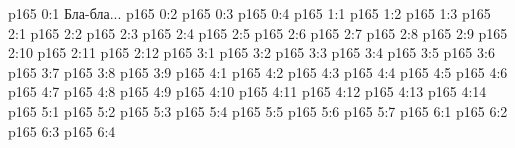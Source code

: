 \author{Промежуточные создания}
\vs p165 0:1  Бла-бла...
\vs p165 0:2 
\vs p165 0:3 
\vs p165 0:4 
\vs p165 1:1 
\vs p165 1:2 
\vs p165 1:3 
\vs p165 2:1 
\vs p165 2:2 \pc 
\vs p165 2:3 
\vs p165 2:4 
\vs p165 2:5 \pc 
\vs p165 2:6 
\vs p165 2:7 
\vs p165 2:8 
\vs p165 2:9 
\vs p165 2:10 
\vs p165 2:11 \pc 
\vs p165 2:12 
\vs p165 3:1 
\vs p165 3:2 \pc 
\vs p165 3:3 
\vs p165 3:4 
\vs p165 3:5 
\vs p165 3:6 
\vs p165 3:7 
\vs p165 3:8 
\vs p165 3:9 \pc 
{}
\vs p165 4:1 
\vs p165 4:2 \pc 
\vs p165 4:3 
\vs p165 4:4 \pc 
\vs p165 4:5 
\vs p165 4:6 
\vs p165 4:7 \pc 
\vs p165 4:8 \pc 
\vs p165 4:9 
\vs p165 4:10 
\vs p165 4:11 
\vs p165 4:12 
\vs p165 4:13 
\vs p165 4:14 \pc 
{}
\vs p165 5:1 
\vs p165 5:2 \pc 
\vs p165 5:3 
\vs p165 5:4 
\vs p165 5:5 
\vs p165 5:6 
\vs p165 5:7 \pc 
{}
\vs p165 6:1 
\vs p165 6:2 \pc 
\vs p165 6:3 
\vs p165 6:4 \pc 
\quizlink
